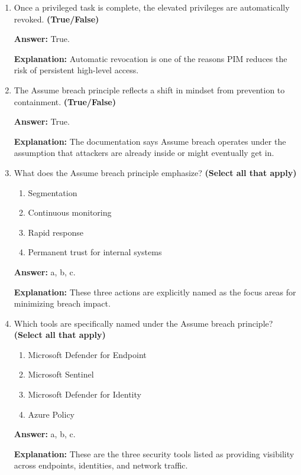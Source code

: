 \documentclass[10pt]{article}
\begin{document}
\begin{enumerate}[leftmargin=*]
\textbf{Answer:} True.

\textbf{Explanation:} The documentation gives this exact example when explaining PIM and just-in-time elevation.

\item Once a privileged task is complete, the elevated privileges are automatically revoked. \textbf{(True/False)}

\textbf{Answer:} True.

\textbf{Explanation:} Automatic revocation is one of the reasons PIM reduces the risk of persistent high-level access.

\item The Assume breach principle reflects a shift in mindset from prevention to containment. \textbf{(True/False)}

\textbf{Answer:} True.

\textbf{Explanation:} The documentation says Assume breach operates under the assumption that attackers are already inside or might eventually get in.

\item What does the Assume breach principle emphasize? \textbf{(Select all that apply)}
\begin{enumerate}[label=\alph*., leftmargin=1.5em]
\item Segmentation
\item Continuous monitoring
\item Rapid response
\item Permanent trust for internal systems
\end{enumerate}
\textbf{Answer:} a, b, c.

\textbf{Explanation:} These three actions are explicitly named as the focus areas for minimizing breach impact.

\item Which tools are specifically named under the Assume breach principle? \textbf{(Select all that apply)}
\begin{enumerate}[label=\alph*., leftmargin=1.5em]
\item Microsoft Defender for Endpoint
\item Microsoft Sentinel
\item Microsoft Defender for Identity
\item Azure Policy
\end{enumerate}
\textbf{Answer:} a, b, c.

\textbf{Explanation:} These are the three security tools listed as providing visibility across endpoints, identities, and network traffic.


\end{enumerate}
\end{document}
